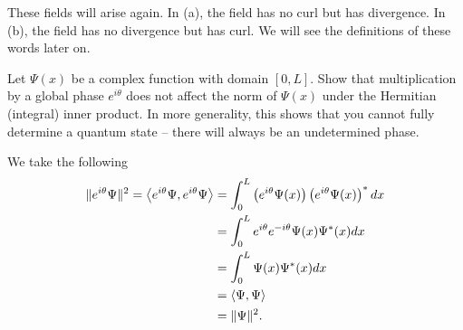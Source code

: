 \documentclass[12pt]{article} %
\begin{document}
\begin{solution}
		These fields will arise again. In (a), the field has no curl but has divergence. In (b), the field has no divergence but has curl. We will see the definitions of these words later on.
\end{solution}

\newpage
\begin{problem}
	Let $\Psi(x)$ be a complex function with domain $[0,L]$.  Show that multiplication by a global phase $e^{i\theta}$ does not affect the norm of $\Psi(x)$ under the Hermitian (integral) inner product. In more generality, this shows that you cannot fully determine a quantum state -- there will always be an undetermined phase.
\end{problem}
\begin{solution}
	We take the following
	\begin{align*}
		\|e^{i\theta} \Psi\|^2=\left\langle e^{i\theta}\Psi, e^{i\theta}\Psi \right\rangle &= \int_0^L \left(e^{i\theta}\Psi(x)\right)\left(e^{i\theta}\Psi(x)\right)^*dx\\
		&= \int_0^L e^{i\theta}e^{-i\theta} \Psi(x)\Psi^*(x)dx\\
		&= \int_0^L \Psi(x)\Psi^*(x)dx\\
		&= \left\langle \Psi, \Psi \right\rangle\\
		&= \|\Psi\|^2.
	\end{align*}
\end{solution}
\end{document}
